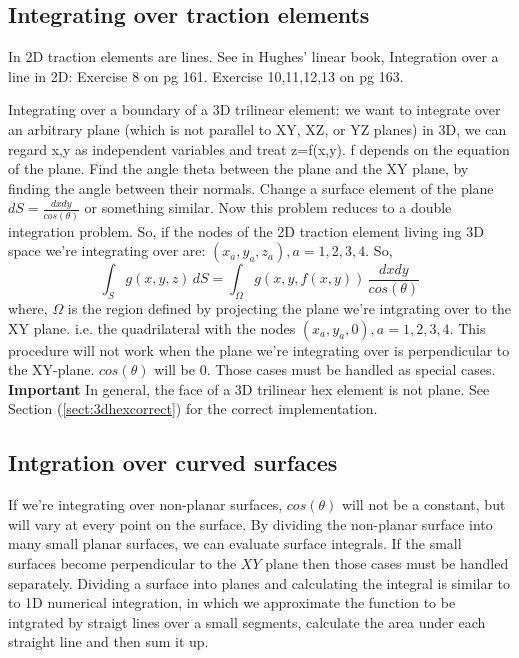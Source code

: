 \documentclass{article}
\newcommand{\beq}{\begin{equation}}
\newcommand{\eeq}{\end{equation}}
\begin{document}
\subsection{Integrating over traction elements}
In 2D traction elements are lines. See in Hughes' linear book, Integration over a line in 2D: Exercise 8 on pg 161. Exercise 10,11,12,13 on pg 163.

Integrating over a boundary of a 3D trilinear element: we want to integrate over an arbitrary plane (which is not parallel to XY, XZ, or YZ planes) in 3D, we can regard x,y as independent variables and treat z=f(x,y). f depends on the equation of the plane.  Find the angle theta between the plane and the XY plane, by finding the angle between their normals. Change a surface element of the plane $dS=\frac{dxdy}{cos(\theta)}$ or something similar. Now this problem reduces to a double integration problem. So, if the nodes of the 2D traction element living ing 3D space we're integrating over are: $(x_a,y_a,z_a), a=1,2,3,4$. So,
\beq
\int_{S}g(x,y,z)\,dS = \int_{\Omega} g(x,y,f(x,y))\,\frac{dxdy}{cos(\theta)}
\eeq
where, $\Omega$ is the region defined by projecting the plane we're intgrating over to the XY plane. i.e. the quadrilateral with the nodes $(x_a,y_a,0), a=1,2,3,4$. This procedure will not work when the plane we're integrating over is perpendicular to the XY-plane. $cos(\theta)$ will be $0$. Those cases must be handled as special cases.
{\textbf{Important}} In general, the face of a 3D trilinear hex element is not plane. See Section (\ref{sect:3dhexcorrect}) for the correct implementation. 

\subsection{Intgration over curved surfaces}
If we're integrating over non-planar surfaces, $cos(\theta)$ will not be a constant, but will vary at every point on the surface. By dividing the non-planar surface into many small planar surfaces, we can evaluate surface integrals. If the small surfaces become perpendicular to the $XY$ plane then those cases must be handled separately. Dividing a surface into planes and calculating the integral is similar to to 1D numerical integration, in which we approximate the function to be intgrated by straigt lines over a small segments, calculate the area under each straight line and then sum it up.
\end{document}
